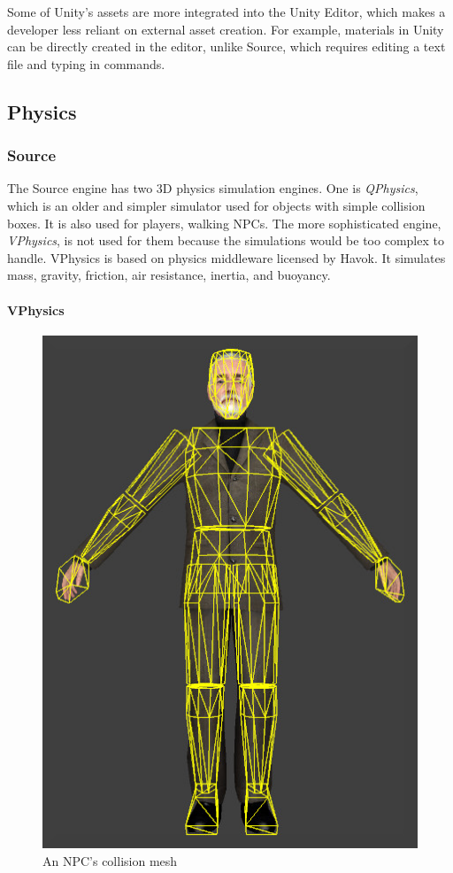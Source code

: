 \documentclass[a4paper, 12pt]{scrartcl}
\begin{document}
Some of Unity's assets are more integrated into the Unity Editor, which makes a developer less reliant on external asset creation. For example, materials in Unity can be directly created in the editor, unlike Source, which requires editing a text file and typing in commands.

\subsection{Physics}
\subsubsection{Source}
The Source engine has two 3D physics simulation engines. One is \textit{QPhysics}, which is an older and simpler simulator used for objects with simple collision boxes. It is also used for players, walking NPCs. The more sophisticated engine, \textit{VPhysics}, is not used for them because the simulations would be too complex to handle. VPhysics is based on physics middleware licensed by Havok. It simulates mass, gravity, friction, air resistance, inertia, and buoyancy.

\paragraph{VPhysics}
\begin{figure}
  \centering
  \includegraphics[width=\linewidth]{images/source_collision_mesh.png}
  \caption{An NPC's collision mesh}
  \label{fig:source_collision}
\end{figure}
\end{document}
